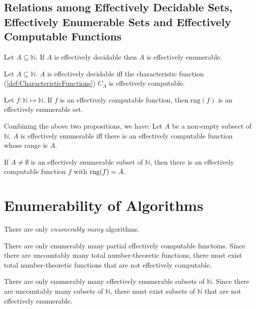 \subsection{Relations among Effectively Decidable Sets, Effectively Enumerable Sets and Effectively Computable Functions}

\begin{proposition}
    Let $A \subseteq \mathbb{N}$. If $A$ is effectively decidable then $A$ is effectively enumerable.
\end{proposition}

\begin{proposition}
    Let $A \subseteq \mathbb{N}$. $A$ is effectively decidable iff the characteristic function (\ref{def:CharacteristicFunctions}) $C_A$ is effectively computable.
\end{proposition}

\begin{proposition}
    Let $f:\mathbb{N}\mapsto\mathbb{N}$. If $f$ is an effectively computable function, then $\textrm{rng}(f)$ is an effectively enumerable set.
\end{proposition}

\begin{proposition}
    Combining the above two propositions, we have: Let $A$ be a non-empty subsect of $\mathbb{N}$, $A$ is effectively enumerable iff there is an effectively computable function whose range is $A$.
\end{proposition}

\begin{proposition}
    If $A\neq\emptyset$ is an effectively enumerable subset of $\mathbb{N}$, then there is an effectively computable function $f$ with $\textrm{rng}(f)=A$.
\end{proposition}

\section{Enumerability of Algorithms}
\label{sec:EnumerabilityOfAlgos}

\begin{theorem}
    There are only \emph{enumerably many} algorithms.
\end{theorem}
\begin{corollary}
    There are only enumerably many partial effectively computable functoins. Since there are uncountably many total number-theoretic functions, there must exist total number-theoretic functions that are not effectively computable.
\end{corollary}
\begin{corollary}
    There are only enumerably many effectively enumerable subsets of $\mathbb{N}$. Since there are uncountably many subsets of $\mathbb{N}$, there must exist subsets of $\mathbb{N}$ that are not effectively enumerable.
\end{corollary}

